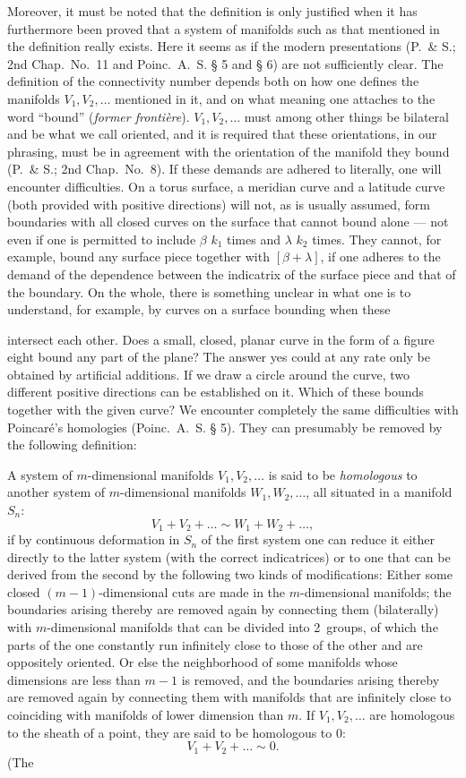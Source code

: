 \documentclass{article}
\begin{document}
Moreover, it must be noted that the definition is only justified when it has furthermore been proved that a system of manifolds such as that mentioned in the definition really exists. Here it seems as if the modern presentations (P.\ \& S.; 2nd Chap.\ No.\ 11 and Poinc.\ A.~S. § 5 and § 6) are not sufficiently clear. The definition of the connectivity number depends both on how one defines the manifolds $V_1, V_2, \dots$ mentioned in it, and on what meaning one attaches to the word ``bound'' (\emph{former frontière}). $V_1, V_2, \dots$ must among other things be bilateral and be what we call oriented, and it is required that these orientations, in our phrasing, must be in agreement with the orientation of the manifold they bound (P.\ \& S.; 2nd Chap.\ No.\ 8). If these demands are adhered to literally, one will encounter difficulties. On a torus surface, a meridian curve and a latitude curve (both provided with positive directions) will not, as is usually assumed, form boundaries with all closed curves on the surface that cannot bound alone --- not even if one is permitted to include $\beta$ $k_1$ times and $\lambda$ $k_2$ times. They cannot, for example, bound any surface piece together with $[\beta + \lambda]$, if one adheres to the demand of the dependence between the indicatrix of the surface piece and that of the boundary. On the whole, there is something unclear in what one is to understand, for example, by curves on a surface bounding when these

intersect each other. Does a small, closed, planar curve in the form of a figure eight bound any part of the plane? The answer yes could at any rate only be obtained by artificial additions. If we draw a circle around the curve, two different positive directions can be established on it. Which of these bounds together with the given curve? We encounter completely the same difficulties with Poincaré's homologies (Poinc.\ A.~S. § 5). They can presumably be removed by the following definition:

A system of $m$-dimensional manifolds $V_1, V_2, \dots$ is said to be \emph{homologous} to another system of $m$-dimensional manifolds $W_1, W_2, \dots$, all situated in a manifold $S_n$:
\[
V_1 + V_2 + \dots \sim W_1 + W_2 + \dots,
\]
if by continuous deformation in $S_n$ of the first system one can reduce it either directly to the latter system (with the correct indicatrices) or to one that can be derived from the second by the following two kinds of modifications: Either some closed $(m - 1)$-dimensional cuts are made in the $m$-dimensional manifolds; the boundaries arising thereby are removed again by connecting them (bilaterally) with $m$-dimensional manifolds that can be divided into 2~groups, of which the parts of the one constantly run infinitely close to those of the other and are oppositely oriented. Or else the neighborhood of some manifolds whose dimensions are less than $m - 1$ is removed, and the boundaries arising thereby are removed again by connecting them with manifolds that are infinitely close to coinciding with manifolds of lower dimension than $m$. If $V_1, V_2, \dots$ are homologous to the sheath of a point, they are said to be homologous to 0:
\[
V_1 + V_2 + \dots \sim 0.
\]
(The
\end{document}
